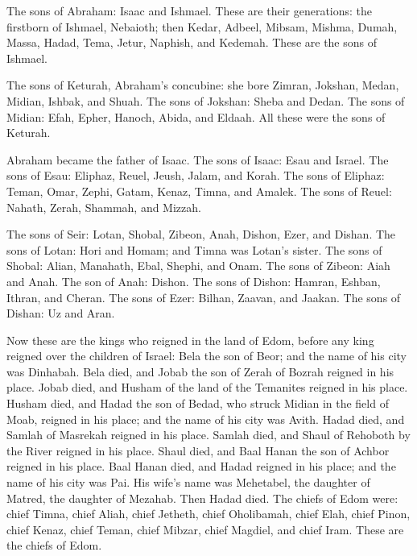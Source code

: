 \myverse{}The sons of Abraham: Isaac and Ishmael.
\myverse{}These are their generations: the firstborn of Ishmael, Nebaioth; then Kedar,
Adbeel, Mibsam,
\myverse{}Mishma, Dumah, Massa, Hadad, Tema,
\myverse{}Jetur, Naphish, and Kedemah. These are the sons of Ishmael.

\myverse{}The sons of Keturah, Abraham’s concubine: she bore Zimran, Jokshan,
Medan, Midian, Ishbak, and Shuah. The sons of Jokshan: Sheba and Dedan.
\myverse{}The sons of Midian: Efah, Epher, Hanoch, Abida, and Eldaah. All these were
the sons of Keturah.

\myverse{}Abraham became the father of Isaac. The sons of Isaac: Esau and
Israel.
\myverse{}The sons of Esau: Eliphaz, Reuel, Jeush, Jalam, and Korah.
\myverse{}The sons of Eliphaz: Teman, Omar, Zephi, Gatam, Kenaz, Timna, and Amalek.
\myverse{}The sons of Reuel: Nahath, Zerah, Shammah, and Mizzah.

\myverse{}The sons of Seir: Lotan, Shobal, Zibeon, Anah, Dishon, Ezer,
and Dishan.
\myverse{}The sons of Lotan: Hori and Homam; and Timna was Lotan’s sister.
\myverse{}The sons of Shobal: Alian, Manahath, Ebal, Shephi, and Onam. The sons of Zibeon:
Aiah and Anah.
\myverse{}The son of Anah: Dishon. The sons of Dishon: Hamran, Eshban, Ithran, and Cheran.
\myverse{}The sons of Ezer: Bilhan, Zaavan, and Jaakan. The sons of Dishan: Uz and Aran.

\myverse{}Now these are the kings who reigned in the land of Edom, before
any king reigned over the children of Israel: Bela the son of Beor; and the name of his city was Dinhabah.
\myverse{}Bela died, and Jobab the son of Zerah of Bozrah reigned in his place.
\myverse{}Jobab died, and Husham of the land of the Temanites reigned in his place.
\myverse{}Husham died, and Hadad the son of Bedad, who struck Midian in the field of
Moab, reigned in his place; and the name of his city was Avith.
\myverse{}Hadad died, and Samlah of Masrekah reigned in his place.
\myverse{}Samlah died, and Shaul of Rehoboth by the River reigned in his place.
\myverse{}Shaul died, and Baal Hanan the son of Achbor reigned in his place.
\myverse{}Baal Hanan died, and Hadad reigned in his place; and the name of his city
was Pai. His wife’s name was Mehetabel, the daughter of Matred, the daughter of Mezahab.
\myverse{}Then Hadad died. The chiefs of Edom were: chief Timna, chief Aliah, chief
Jetheth,
\myverse{}chief Oholibamah, chief Elah, chief Pinon,
\myverse{}chief Kenaz, chief Teman, chief Mibzar,
\myverse{}chief Magdiel, and chief Iram. These are the chiefs of Edom.


